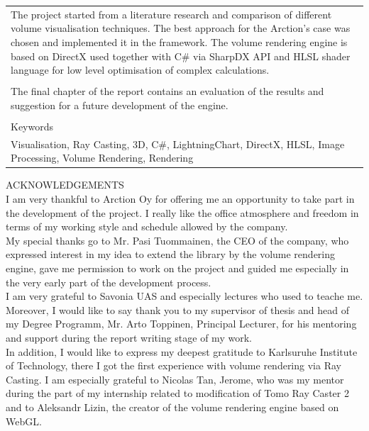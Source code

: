 \documentclass[twoside, english, 11pt]{report}
\begin{document}
\begin{table}[!h]
\begin{tabular}{| l | l | l | l |}
\multicolumn{4}{|p{14cm}|}{
The project started from a literature research and comparison of different volume visualisation techniques. The best approach for the Arction's case was chosen and implemented it in the framework. The volume rendering engine is based on DirectX used together with C\# via SharpDX API and HLSL shader language for low level optimisation of complex calculations.
}\\
\multicolumn{4}{|l|}{ }\\
\multicolumn{4}{|p{14cm}|}{
The final chapter of the report contains an evaluation of the results and suggestion for a future development of the engine.
}\\
\multicolumn{4}{|l|}{ }\\
\hline
\multicolumn{4}{|l|}{Keywords}\\
\multicolumn{4}{|p{14cm}|}{
Visualisation, Ray Casting, 3D, C\#, LightningChart, DirectX, HLSL, Image Processing, Volume Rendering, Rendering
}\\
\hline
\end{tabular}
\end{table}

\newpage

ACKNOWLEDGEMENTS\\

I am very thankful to Arction Oy for offering me an opportunity to take part in the development of the project. I really like the office atmosphere and freedom in terms of my working style and schedule allowed by the company.\\

My special thanks go to Mr. Pasi Tuommainen, the CEO of the company, who expressed interest in my idea to extend the library by the volume rendering engine, gave me permission to work on the project and guided me especially in the very early part of the development process.\\

I am very grateful to Savonia UAS and especially lectures who used to teache me.  Moreover, I would like to say thank you to my supervisor of thesis and head of my Degree Programm, Mr. Arto Toppinen, Principal Lecturer, for his mentoring and support during the report writing stage of my work. \\

In addition, I would like to express my deepest gratitude to Karlsuruhe Institute of Technology, there I got the first experience with volume rendering via Ray Casting. I am especially grateful to Nicolas Tan, Jerome, who was my mentor during the part of my internship related to modification of Tomo Ray Caster 2 and to Aleksandr Lizin, the creator of the volume rendering engine based on WebGL.
\end{document}
